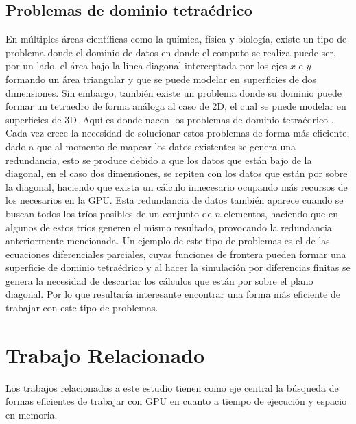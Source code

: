 \documentclass[10pt, conference, compsocconf, onecolumn]{IEEEtran}
\begin{document}
 \subsection{Problemas de dominio tetra\'edrico}
 \label{sub_sec_ModTriple}
 
  En m\'ultiples \'areas cient\'ificas como la qu\'imica, f\'isica y biolog\'ia, existe un tipo de problema donde el dominio de datos en donde el computo se realiza puede ser, por un lado, el \'area bajo la linea diagonal interceptada por los ejes $x$ e $y$ formando un \'area triangular y que se puede modelar en superficies de dos dimensiones. Sin embargo, tambi\'en existe un problema donde su dominio puede formar un tetraedro de forma an\'aloga  al caso de 2D, el cual se puede modelar en superficies de 3D. Aqu\'i es donde nacen los problemas de dominio tetra\'edrico \cite{EffectTriplet1992} \cite{ThreadMapforSimplex2018}. Cada vez crece la necesidad de solucionar estos problemas de forma m\'as eficiente, dado a que al momento de mapear los datos existentes se genera una redundancia, esto se produce debido a que los datos que est\'an bajo de la diagonal, en el caso dos dimensiones, se repiten con los datos que est\'an por sobre la diagonal, haciendo que exista un c\'alculo innecesario ocupando m\'as recursos de los necesarios en la GPU. Esta redundancia de datos tambi\'en aparece  cuando se buscan todos los tr\'ios posibles de un conjunto de $n$ elementos, haciendo que en algunos de estos tr\'ios generen el mismo resultado, provocando la redundancia anteriormente mencionada. Un ejemplo de este tipo de problemas es el de las ecuaciones diferenciales parciales, cuyas funciones de frontera pueden formar una superficie de dominio tetra\'edrico y al hacer la simulaci\'on por diferencias finitas se genera la necesidad de descartar los c\'alculos que est\'an por sobre el plano diagonal. Por lo que resultar\'ia interesante encontrar una forma m\'as eficiente de trabajar con este tipo de problemas.
 





\section{Trabajo Relacionado}
\label{sec_trabajo_relacionado}

Los trabajos relacionados a este estudio tienen como eje central la b\'usqueda de formas  eficientes de trabajar con GPU en cuanto a tiempo de ejecuci\'on y espacio en memoria.
\end{document}
